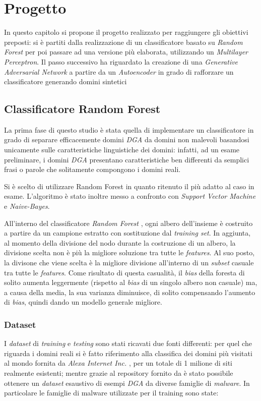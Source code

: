 \chapter{Progetto}
\label{progetto}

In questo capitolo si propone il progetto realizzato per raggiungere gli obiettivi preposti: si è partiti dalla realizzazione di un classificatore basato su \textit{Random Forest} per poi passare ad una versione più elaborata, utilizzando un \textit{Multilayer Perceptron}. Il passo successivo ha riguardato la creazione di una \textit{Generative Adversarial Network} a partire da un \textit{Autoencoder} in grado di rafforzare un classificatore generando domini sintetici


\section{Classificatore Random Forest}
\label{randomforest}
La prima fase di questo studio è stata quella di implementare un classificatore in grado di separare efficacemente domini \textit{DGA} da domini non malevoli basandosi unicamente sulle caratteristiche linguistiche dei domini: infatti, ad un esame preliminare, i domini \textit{DGA} presentano caratteristiche ben differenti da semplici frasi o parole che solitamente compongono i domini reali.

Si è scelto di utilizzare Random Forest in quanto ritenuto il più adatto al caso in esame. L'algoritmo è stato inoltre messo a confronto con \textit{Support Vector Machine} e \textit{Naive-Bayes}. 

All'interno del classificatore \textit{Random Forest} \cite{randomforest}, ogni albero dell'insieme è costruito a partire da un campione estratto con sostituzione dal \textit{training set}. In aggiunta, al momento della divisione del nodo durante la costruzione di un albero, la divisione scelta non è più la migliore soluzione tra tutte le \textit{features}. Al suo posto, la divisone che viene scelta è la migliore divisione all'interno di un \textit{subset} casuale tra tutte le \textit{features}. Come risultato di questa casualità, il \textit{bias} della foresta di solito aumenta leggermente (rispetto al \textit{bias} di un singolo albero non casuale) ma, a causa della media, la sua varianza diminuisce, di solito compensando l'aumento di \textit{bias}, quindi dando un modello generale migliore.

\subsection{Dataset}
\label{randomforestdataset}
I \textit{dataset} di \textit{training} e \textit{testing} sono stati ricavati due fonti differenti: per quel che riguarda i domini reali si è fatto riferimento alla classifica dei domini più visitati al mondo fornita da \textit{Alexa Internet Inc.} \cite{amazon:alexa} , per un totale di 1 milione di siti realmente esistenti; mentre grazie al repository fornito da \cite{github:dgarepo} è stato possibile ottenere un \textit{dataset} esaustivo di esempi \textit{DGA} da diverse famiglie di \textit{malware}. In particolare le famiglie di malware utilizzate per il training sono state: 

